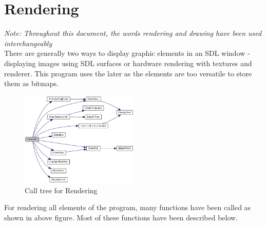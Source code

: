 \documentclass[report]{subfiles}
\begin{document}
    \section{Rendering}
    \textit{Note: Throughout this document, the words rendering and drawing have been used interchangeably}\\
    There are generally two ways to display graphic elements in an SDL window - displaying images using SDL surfaces or hardware rendering with textures and renderer. This program uses the later as the elements are too versatile to store them as bitmaps.
    \begin{figure}[H]
        \centering
        \includegraphics[width=0.5\textwidth]{graphics/render_call_tree.png}
        \caption{Call tree for Rendering}
    \end{figure}
    For rendering all elements of the program, many functions have been called as shown in above figure. Most of these functions have been described below.
\end{document}
